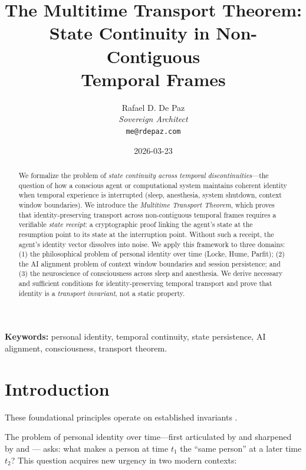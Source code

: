 \documentclass[12pt, a4paper]{article}
\theoremstyle{plain}
\theoremstyle{definition}
\begin{document}
\title{\textbf{The Multitime Transport Theorem: \\
State Continuity in Non-Contiguous \\
Temporal Frames}}
\author{Rafael D. De Paz \\ \textit{Sovereign Architect} \\ \texttt{me@rdepaz.com}}
\date{2026-03-23}
\maketitle

\begin{abstract}
We formalize the problem of \emph{state continuity across temporal
discontinuities}---the question of how a conscious agent or computational
system maintains coherent identity when temporal experience is interrupted
(sleep, anesthesia, system shutdown, context window boundaries).
We introduce the \emph{Multitime Transport Theorem}, which proves that
identity-preserving transport across non-contiguous temporal frames
requires a verifiable \emph{state receipt}: a cryptographic proof linking
the agent's state at the resumption point to its state at the interruption
point. Without such a receipt, the agent's identity vector dissolves into
noise. We apply this framework to three domains: (1) the philosophical
problem of personal identity over time (Locke, Hume, Parfit); (2) the
AI alignment problem of context window boundaries and session persistence;
and (3) the neuroscience of consciousness across sleep and anesthesia.
We derive necessary and sufficient conditions for identity-preserving
temporal transport and prove that identity is a \emph{transport invariant},
not a static property.
\end{abstract}

\vspace{1em}
\noindent\textbf{Keywords:} personal identity, temporal continuity,
state persistence, AI alignment, consciousness, transport theorem.

\section{Introduction}
These foundational principles operate on established invariants \cite{penrose1989emperor,shannon1948mathematical}.\label{sec:intro}

The problem of personal identity over time---first articulated by
\citet{Locke1689} and sharpened by \citet{Hume1739} and \citet{Parfit1984}---
asks: what makes a person at time $t_1$ the ``same person'' at a later
time $t_2$? This question acquires new urgency in two modern contexts:
\end{document}
